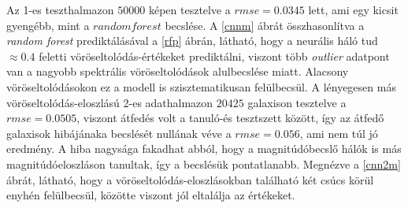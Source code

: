 \documentclass[12pt,letterpaper,twoside,openright]{book}
\begin{document}
\newline\indent
 Az 1-es teszthalmazon $\num{50000}$ képen tesztelve a $\textit{rmse} = 0.0345$ lett, ami egy kicsit gyengébb, mint a $random forest$ becslése. A \ref{cnnm} ábrát összhasonlítva a \textit{random forest} prediktálásával a \ref{rfp} ábrán, látható, hogy a neurális háló tud  $\approx 0.4$ feletti vöröseltolódás-értékeket prediktálni, viszont több \textit{outlier} adatpont van a nagyobb spektrális vöröseltolódások alulbecslése miatt. Alacsony vöröseltolódásokon ez a modell is szisztematikusan felülbecsül. A lényegesen más vöröseltolódás-eloszlású 2-es adathalmazon $\num{20425}$ galaxison tesztelve a $\textit{rmse} = 0.0505$, viszont átfedés volt a tanuló-és tesztszett között, így az átfedő galaxisok hibájánaka becslését nullának véve a $rmse =  0.056$, ami nem túl jó eredmény. A hiba nagysága fakadhat abból, hogy a magnitúdóbecslő hálók is más magnitúdóeloszláson tanultak, így a becslésük pontatlanabb. Megnézve a \ref{cnn2m} ábrát, látható, hogy a vöröseltolódás-eloszlásokban található két csúcs körül enyhén felülbecsül, közötte viszont jól eltalálja az értékeket.
\end{document}
